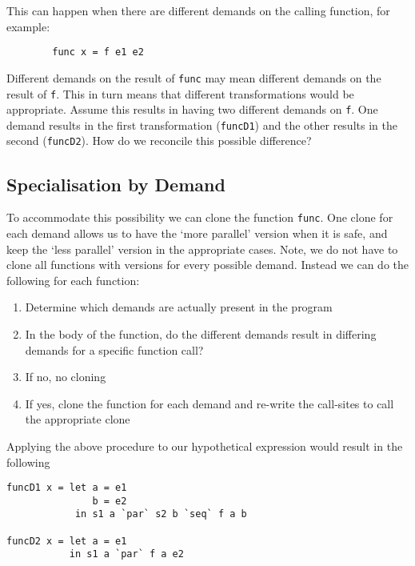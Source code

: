 This can happen when there are different demands on the calling function, for
example:

\begin{verbatim}
        func x = f e1 e2
\end{verbatim}

Different demands on the result of \verb`func` may mean different demands on
the result of \verb`f`. This in turn means that different transformations would
be appropriate. Assume this results in having two different demands on
\verb`f`. One demand results in the first transformation (\verb-funcD1-) and
the other results in the second (\verb-funcD2-). How do we reconcile this
possible difference?

\subsection*{Specialisation by Demand}

To accommodate this possibility we can clone the function \verb`func`. One
clone for each demand allows us to have the `more parallel' version when it
is safe, and keep the `less parallel' version in the appropriate cases. Note,
we do not have to clone all functions with versions for every possible demand.
Instead we can do the following for each function:

\begin{enumerate}
    \item Determine which demands are actually present in the program
    \item In the body of the function, do the different demands result in differing
        demands for a specific function call?
    \item If no, no cloning
    \item If yes, clone the function for each demand and re-write the call-sites to call
        the appropriate clone
\end{enumerate}

Applying the above procedure to our hypothetical expression would result in the
following


\begin{verbatim}
funcD1 x = let a = e1
               b = e2
            in s1 a `par` s2 b `seq` f a b

funcD2 x = let a = e1
           in s1 a `par` f a e2
\end{verbatim}


